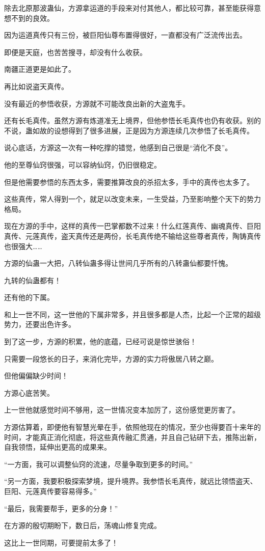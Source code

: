 \begin{this_body}
除去北原那波蛊仙，方源拿运道的手段来对付其他人，都比较可靠，甚至能获得意想不到的良效。

因为运道真传只有三份，被巨阳仙尊布置得很好，一直都没有广泛流传出去。

即便是天庭，也苦苦搜寻，却没有什么收获。

南疆正道更是如此了。

再比如说盗天真传。

没有最近的参悟收获，方源就不可能改良出新的大盗鬼手。

还有长毛真传。虽然方源有炼道准无上境界，但他参悟长毛真传也仍有收获。别的不说，蛊如故的设想得到了很多进展，正是因为方源连续几次参悟了长毛真传。

说心底话，方源这一次有一种吃撑的错觉，他感到自己很是“消化不良”。

他的至尊仙窍很强，可以容纳仙窍，仍旧很稳定。

但是他需要参悟的东西太多，需要推算改良的杀招太多，手中的真传也太多了。

这些真传，常人得到一个，就足以改变未来，一生受益，乃至影响整个天下的势力格局。

现在方源的手中，这样的真传一巴掌都数不过来！什么红莲真传、幽魂真传、巨阳真传、元莲真传，盗天真传还是两份，长毛真传绝不输给这些尊者真传，陶铸真传也很强大……

方源的仙蛊一大把，八转仙蛊多得让世间几乎所有的八转蛊仙都要忏愧。

九转的仙蛊都有！

还有他的下属。

和上一世不同，这一世他的下属非常多，并且很多都是人杰，比起一个正常的超级势力，还要出色许多。

到了这一步，方源的积累，他的底蕴，已经可说是惊世骇俗！

只需要一段悠长的日子，来消化完毕，方源的实力将傲居八转之巅。

但他偏偏缺少时间！

方源心底苦笑。

上一世他就感觉时间不够用，这一世情况变本加厉了，这份感觉更厉害了。

方源估算着，即便他有智慧光晕在手，依照他现在的情况，至少也得要百十来年的时间，才能真正消化彻底，将这些真传融汇贯通，并且自己钻研下去，推陈出新，自我领悟，延伸出更高的成果来。

“一方面，我可以调整仙窍的流速，尽量争取到更多的时间。”

“另一方面，我要积极探索梦境，提升境界。我参悟长毛真传，就远比领悟盗天、巨阳、元莲真传要容易得多。”

“最后，我需要帮手，更多的分身！”

在方源的殷切期盼下，数日后，荡魂山修复完成。

这比上一世同期，可要提前太多了！

\end{this_body}

